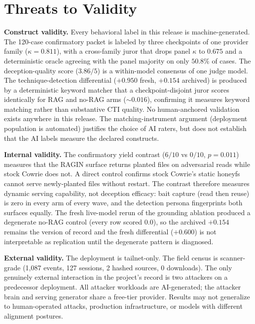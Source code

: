 \section{Threats to Validity}
\label{sec:threats}

\textbf{Construct validity.} Every behavioral label in this release is
machine-generated. The 120-case confirmatory packet is labeled by three
checkpoints of one provider family ($\kappa=0.811$), with a
cross-family juror that drops panel $\kappa$ to $0.675$ and a
deterministic oracle agreeing with the panel majority on only $50.8\%$
of cases. The deception-quality score ($3.86/5$) is a within-model
consensus of one judge model. The technique-detection differential
($+0.950$ fresh, $+0.154$ archived) is produced by a deterministic
keyword matcher that a checkpoint-disjoint juror scores identically for
RAG and no-RAG arms ($\sim$$0.016$), confirming it measures keyword
matching rather than substantive CTI quality. No human-anchored
validation exists anywhere in this release. The matching-instrument
argument (deployment population is automated) justifies the choice of
AI raters, but does not establish that the AI labels measure the
declared constructs.

\textbf{Internal validity.} The confirmatory yield contrast
($6/10$ vs $0/10$, $p=0.011$) measures that the RAGIN surface returns
planted files on adversarial reads while stock Cowrie does not. A
direct control confirms stock Cowrie's static honeyfs cannot serve
newly-planted files without restart. The contrast therefore measures
dynamic serving capability, not deception efficacy: bait capture (read
then reuse) is zero in every arm of every wave, and the detection
persona fingerprints both surfaces equally. The fresh live-model rerun
of the grounding ablation produced a degenerate no-RAG control (every
row scored $0.0$), so the archived $+0.154$ remains the version of
record and the fresh differential ($+0.600$) is not interpretable as
replication until the degenerate pattern is diagnosed.

\textbf{External validity.} The deployment is tailnet-only. The field
census is scanner-grade (1,087 events, 127 sessions, 2 hashed sources,
0 downloads). The only genuinely external interaction in the project's
record is two attackers on a predecessor deployment. All attacker
workloads are AI-generated; the attacker brain and serving generator
share a free-tier provider. Results may not generalize to
human-operated attacks, production infrastructure, or models with
different alignment postures.

